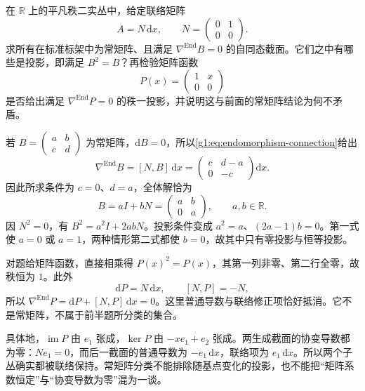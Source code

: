 \begin{exercise}\label{g1:ex:endomorphism-connection-commutant}
	在 \(\mathbb R\) 上的平凡秩二实丛中，给定联络矩阵
	\[
		A=N\,\mathrm{d}x,\qquad N=\begin{pmatrix}0&1\\0&0\end{pmatrix}.
	\]
	求所有在标准标架中为常矩阵、且满足 \(\nabla^{\operatorname{End}}B=0\) 的自同态截面。它们之中有哪些是投影，即满足 \(B^2=B\)？再检验矩阵函数
	\[
		P(x)=\begin{pmatrix}1&x\\0&0\end{pmatrix}
	\]
	是否给出满足 \(\nabla^{\operatorname{End}}P=0\) 的秩一投影，并说明这与前面的常矩阵结论为何不矛盾。
\end{exercise}
\begin{solution}
	若 \(B=\begin{pmatrix}a&b\\c&d\end{pmatrix}\) 为常矩阵，\(\mathrm{d}B=0\)，所以\eqref{g1:eq:endomorphism-connection}给出
	\[
		\nabla^{\operatorname{End}}B=[N,B]\,\mathrm{d}x
		=\begin{pmatrix}c&d-a\\0&-c\end{pmatrix}\mathrm{d}x.
	\]
	因此所求条件为 \(c=0\)、\(d=a\)，全体解恰为
	\[
		B=aI+bN=\begin{pmatrix}a&b\\0&a\end{pmatrix},\qquad a,b\in\mathbb R.
	\]
	因 \(N^2=0\)，有 \(B^2=a^2I+2abN\)。投影条件变成 \(a^2=a\)、\((2a-1)b=0\)。第一式使 \(a=0\) 或 \(a=1\)，两种情形第二式都使 \(b=0\)，故其中只有零投影与恒等投影。

	对题给矩阵函数，直接相乘得 \(P(x)^2=P(x)\)，其第一列非零、第二行全零，故秩恒为 \(1\)。此外
	\[
		\mathrm{d}P=N\,\mathrm{d}x,\qquad [N,P]=-N,
	\]
	所以 \(\nabla^{\operatorname{End}}P=\mathrm{d}P+[N,P]\,\mathrm{d}x=0\)。这里普通导数与联络修正项恰好抵消。它不是常矩阵，不属于前半题所分类的集合。

	具体地，\(\operatorname{im}P\) 由 \(e_1\) 张成，\(\ker P\) 由 \(-xe_1+e_2\) 张成。两生成截面的协变导数都为零：\(Ne_1=0\)，而后一截面的普通导数为 \(-e_1\,\mathrm{d}x\)，联络项为 \(e_1\,\mathrm{d}x\)。所以两个子丛确实都被联络保持。常矩阵分类不能排除随基点变化的投影，也不能把“矩阵系数恒定”与“协变导数为零”混为一谈。
\end{solution}

